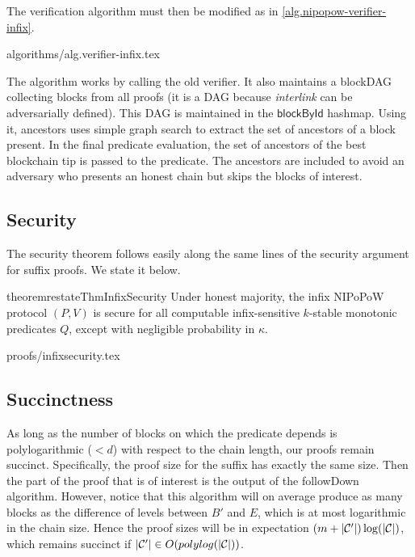 The verification algorithm must then be modified as in
\ref{alg.nipopow-verifier-infix}.

{algorithms/alg.verifier-infix.tex}

The algorithm works by calling the old verifier. It also maintains a blockDAG
collecting blocks from all proofs (it is a DAG because \textit{interlink} can be
adversarially defined). This DAG is maintained in the $\textsf{blockById}$
hashmap. Using it, \textsf{ancestors} uses simple graph search to extract the
set of ancestors of a block present. In the final predicate evaluation, the set
of ancestors of the best blockchain tip is passed to the predicate. The
ancestors are included to avoid an adversary who presents an honest chain but
skips the blocks of interest.

\subsection{Security}
The security theorem follows easily along
the same lines of the security argument for suffix proofs. We state it below.
\begin{restatable}{theorem}{restateThmInfixSecurity}
\label{thm.infix-security}
Under honest majority, the infix NIPoPoW protocol $(P, V)$ is secure for all
computable infix-sensitive $k$-stable monotonic predicates $Q$, except with
negligible probability in $\kappa$.
\end{restatable}
{proofs/infixsecurity.tex}

\subsection{Succinctness}
As long as the number of blocks on which the predicate depends is
polylogarithmic ($< d$) with respect to the chain length, our proofs remain
succinct. Specifically, the proof size for the suffix has exactly the same size.
Then the part of the proof that is of interest is the output of the followDown
algorithm. However, notice that this algorithm will on average produce as many
blocks as the difference of levels between $B'$ and $E$, which is at most
logarithmic in the chain size. Hence the proof sizes will be in expectation $(m +
|\mathcal{C}'|)\log(|\mathcal{C}|)$, which remains succinct if $|\mathcal{C}'| \in
O(polylog(|\mathcal{C}|))$.
